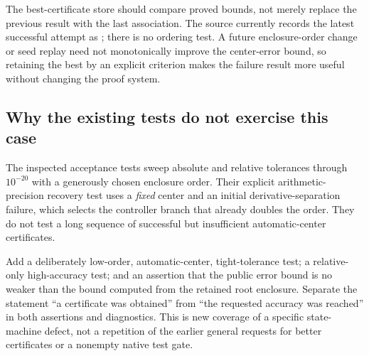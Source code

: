 The best-certificate store should compare proved bounds, not merely replace the previous result with the last association. The source currently records the latest successful attempt as ; there is no ordering test. A future enclosure-order change or seed replay need not monotonically improve the center-error bound, so retaining the best by an explicit criterion makes the failure result more useful without changing the proof system.

\subsection{Why the existing tests do not exercise this case}

The inspected acceptance tests sweep absolute and relative tolerances through $10^{-20}$ with a generously chosen enclosure order. Their explicit arithmetic-precision recovery test uses a \emph{fixed} center and an initial derivative-separation failure, which selects the controller branch that already doubles the order. They do not test a long sequence of successful but insufficient automatic-center certificates.\cite{certtests}

Add a deliberately low-order, automatic-center, tight-tolerance test; a relative-only high-accuracy test; and an assertion that the public error bound is no weaker than the bound computed from the retained root enclosure. Separate the statement ``a certificate was obtained'' from ``the requested accuracy was reached'' in both assertions and diagnostics. This is new coverage of a specific state-machine defect, not a repetition of the earlier general requests for better certificates or a nonempty native test gate.
